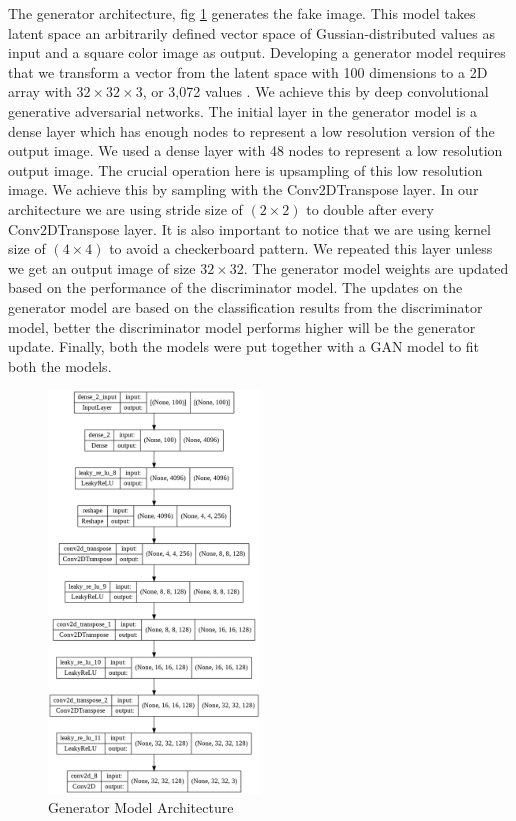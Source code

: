\documentclass{article}
\begin{document}
The generator architecture, fig \ref{fig:compute2} generates the fake image. This model takes latent space an arbitrarily defined vector space of Gussian-distributed values as input and a square color image as output. Developing a generator model requires that we transform a vector from the latent space with 100 dimensions to a 2D array with $32\times32\times3$, or 3,072 values \cite{goodfellow2014generative}. We achieve this by deep convolutional generative adversarial networks. The initial layer in the generator model is a dense layer which has enough nodes to represent a low resolution version of the output image. We used a dense layer with 48 nodes to represent a low resolution output image. The crucial operation here is upsampling of this low resolution image. We achieve this by sampling with the Conv2DTranspose layer. In our architecture we are using stride size of $(2\times2)$ to double after every Conv2DTranspose layer. It is also important to notice that we are using kernel size of $(4\times4)$ to avoid a checkerboard pattern. We repeated this layer unless we get an output image of size $32\times32$. The generator model weights are updated based on the performance of the discriminator model. The updates on the generator model are based on the classification results from the discriminator model, better the discriminator model performs higher will be the generator update. Finally, both the models were put together with a GAN model to fit both the models.  

\begin{figure}[H]
    \centering
    \includegraphics[width=0.5\textwidth]{g_model.png}
    \caption{ Generator Model Architecture}
    \label{fig:compute2}
\end{figure}
  
\end{document}
